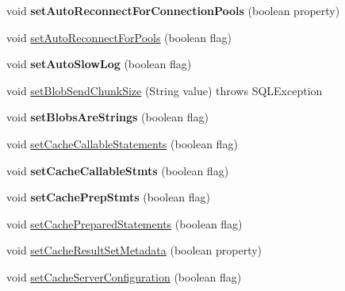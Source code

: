 \begin{DoxyCompactItemize}
void {\bfseries set\+Auto\+Reconnect\+For\+Connection\+Pools} (boolean property)
\item 
void \mbox{\hyperlink{classcom_1_1mysql_1_1jdbc_1_1_multi_host_my_s_q_l_connection_a74082ba356c0d803169347d2abae7efa}{set\+Auto\+Reconnect\+For\+Pools}} (boolean flag)
\item 
\mbox{\label{classcom_1_1mysql_1_1jdbc_1_1_multi_host_my_s_q_l_connection_a681b2ad9256bd8806bcdd654bd20d58c}} 
void {\bfseries set\+Auto\+Slow\+Log} (boolean flag)
\item 
void \mbox{\hyperlink{classcom_1_1mysql_1_1jdbc_1_1_multi_host_my_s_q_l_connection_a8ab368d3783dcf159d7b5055fa104362}{set\+Blob\+Send\+Chunk\+Size}} (String value)  throws S\+Q\+L\+Exception 
\item 
\mbox{\label{classcom_1_1mysql_1_1jdbc_1_1_multi_host_my_s_q_l_connection_a136f227327c8239b99dc121485ebb80b}} 
void {\bfseries set\+Blobs\+Are\+Strings} (boolean flag)
\item 
void \mbox{\hyperlink{classcom_1_1mysql_1_1jdbc_1_1_multi_host_my_s_q_l_connection_a2d8108c12a82b35523797323427b3b45}{set\+Cache\+Callable\+Statements}} (boolean flag)
\item 
\mbox{\label{classcom_1_1mysql_1_1jdbc_1_1_multi_host_my_s_q_l_connection_a340c5b458438283d2dd3e3c72ce267f6}} 
void {\bfseries set\+Cache\+Callable\+Stmts} (boolean flag)
\item 
\mbox{\label{classcom_1_1mysql_1_1jdbc_1_1_multi_host_my_s_q_l_connection_a1bb75d4fa449f88e9dfb1b6f99834eea}} 
void {\bfseries set\+Cache\+Prep\+Stmts} (boolean flag)
\item 
void \mbox{\hyperlink{classcom_1_1mysql_1_1jdbc_1_1_multi_host_my_s_q_l_connection_a867db979855487f8231b63c63c2f1172}{set\+Cache\+Prepared\+Statements}} (boolean flag)
\item 
void \mbox{\hyperlink{classcom_1_1mysql_1_1jdbc_1_1_multi_host_my_s_q_l_connection_a2607114d6964b709318697a7aa065f5f}{set\+Cache\+Result\+Set\+Metadata}} (boolean property)
\item 
void \mbox{\hyperlink{classcom_1_1mysql_1_1jdbc_1_1_multi_host_my_s_q_l_connection_a0e3c4d032287df8965fe62da0755c244}{set\+Cache\+Server\+Configuration}} (boolean flag)

\end{DoxyCompactItemize}

